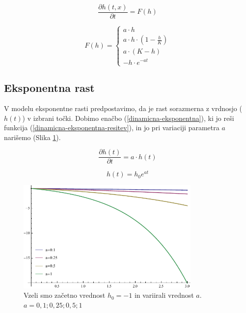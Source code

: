 \documentclass[a4paper, oneside, 12pt]{book}
\begin{document}
            \begin{equation}
              \frac{ \partial h(t,x) }{ \partial t} = F(h)
              \label{dinamicna-splosna}
            \end{equation}

          \begin{equation}
            F(h) = \left \{ \begin{array}{lr} 
            a \cdot h \\
            a \cdot h \cdot (1 - \frac{h}{K}) \\
            a \cdot (K - h) \\
            - h \cdot e^{-a t}
            \end{array} \right. 
            \label{dinamicna-variacije}
          \end{equation}

          \subsection{Eksponentna rast}

          V modelu eksponentne rasti predpostavimo, da je rast sorazmerna z vrdnosjo ($h(t)$) v izbrani točki. Dobimo enačbo (\ref{dinamicna-eksponentna}), ki jo reši funkcija (\ref{dinamicna-eksponentna-resitev}), in jo pri variaciji parametra $a$ narišemo (Slika \ref{fig:eksponentna-rast}).

          \begin{equation}
            \frac{\partial h(t)}{\partial t} = a \cdot h(t)
            \label{dinamicna-eksponentna}
          \end{equation}

          \begin{equation}
            h(t) = h_0 e^{a t}
            \label{dinamicna-eksponentna-resitev}
          \end{equation}

          \begin{figure}[h]
            \begin{center}
              \includegraphics[width=9cm]{slike/eksponentna-rast}
            \end{center}
            \caption{Vzeli smo začetno vrednost $h_0 = -1$ in variirali vrednost $a$. \newline $a=0,1;0,25;0,5;1$}
            \label{fig:eksponentna-rast}
          \end{figure}
\end{document}
